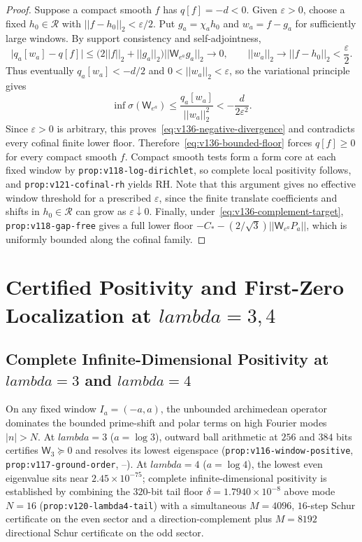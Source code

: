 \documentclass[11pt]{article}
\def\lambda{lambda}%
\def\norm#1{||#1||}%
\theoremstyle{remark}
\newcommand{\norm}[1]{\left\lVert #1\right\rVert}
\begin{document}
\begin{proof}
Suppose a compact smooth $f$ has $q[f] = -d < 0$. Given $\varepsilon > 0$, choose a fixed $h_0 \in \mathcal{R}$ with $\norm{f - h_0}_2 < \varepsilon/2$. Put $g_a = \chi_a h_0$ and $w_a = f - g_a$ for sufficiently large windows. By support consistency and self-adjointness,
\[
  \bigl|q_a[w_a] - q[f]\bigr| \le \bigl(2\norm{f}_2 + \norm{g_a}_2\bigr)\norm{\mathsf{W}_{e^a} g_a}_2 \longrightarrow 0, \qquad \norm{w_a}_2 \longrightarrow \norm{f - h_0}_2 < \frac{\varepsilon}{2}.
\]
Thus eventually $q_a[w_a] < -d/2$ and $0 < \norm{w_a}_2 < \varepsilon$, so the variational principle gives
\begin{equation}\label{eq:v136-negative-amplification}
  \inf\sigma(\mathsf{W}_{e^a}) \le \frac{q_a[w_a]}{\norm{w_a}_2^2} < -\frac{d}{2\varepsilon^2}.
\end{equation}
Since $\varepsilon > 0$ is arbitrary, this proves~\eqref{eq:v136-negative-divergence} and contradicts every cofinal finite lower floor. Therefore~\eqref{eq:v136-bounded-floor} forces $q[f] \ge 0$ for every compact smooth $f$. Compact smooth tests form a form core at each fixed window by \texttt{prop:v118-log-dirichlet}, so complete local positivity follows, and \texttt{prop:v121-cofinal-rh} yields RH. Note that this argument gives no effective window threshold for a prescribed $\varepsilon$, since the finite translate coefficients and shifts in $h_0 \in \mathcal{R}$ can grow as $\varepsilon \downarrow 0$. Finally, under~\eqref{eq:v136-complement-target}, \texttt{prop:v118-gap-free} gives a full lower floor $-C_* - (2/\sqrt{3})\norm{\mathsf{W}_{e^a}P_a}$, which is uniformly bounded along the cofinal family.
\end{proof}

\section{Certified Positivity and First-Zero Localization at \texorpdfstring{$\lambda = 3, 4$}{lambda = 3, 4}}
\label{sec:lambda4}

\subsection{Complete Infinite-Dimensional Positivity at \texorpdfstring{$\lambda = 3$ and $\lambda = 4$}{lambda = 3 and lambda = 4}}
On any fixed window $I_a = (-a,a)$, the unbounded archimedean operator dominates the bounded prime-shift and polar terms on high Fourier modes $|n| > N$. At $\lambda = 3$ ($a = \log 3$), outward ball arithmetic at $256$ and $384$ bits certifies $\mathsf{W}_3 \succeq 0$ and resolves its lowest eigenspace (\texttt{prop:v116-window-positive}, \texttt{prop:v117-ground-order}, --). At $\lambda = 4$ ($a = \log 4$), the lowest even eigenvalue sits near $2.45 \times 10^{-75}$; complete infinite-dimensional positivity is established by combining the $320$-bit tail floor $\delta = 1.7940 \times 10^{-8}$ above mode $N = 16$ (\texttt{prop:v120-lambda4-tail}) with a simultaneous $M = 4096$, $16$-step Schur certificate on the even sector and a direction-complement plus $M = 8192$ directional Schur certificate on the odd sector.
\end{document}

